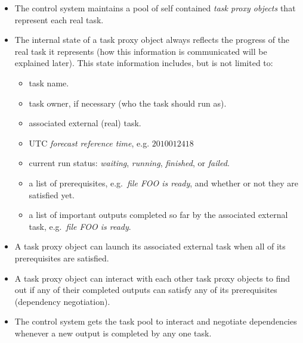 \documentclass[11pt,a4paper]{article}
\begin{document}
\begin{itemize}

    \item The control system maintains a pool of self contained {\em
        task proxy objects} that represent each real task. 
       
    \item The internal state of a task proxy object always reflects the
        progress of the real task it represents (how this information is
        communicated will be explained later). This state information
        includes, but is not limited to:

        \begin{itemize}

            \item task name.

            \item task owner, if necessary (who the task should run as).

            \item associated external (real) task.  

            \item UTC {\em forecast reference time}, e.g. $2010012418$
        
            \item current run status: {\em waiting}, {\em running}, 
                {\em finished}, or {\em failed}. 

            \item a list of prerequisites, e.g.\ {\em file FOO is
                ready}, and whether or not they are satisfied yet.

            \item a list of important outputs completed so far by the
                associated external task, e.g.\ {\em file FOO is ready}.

        \end{itemize}
       
    \item A task proxy object can launch its associated external task
        when all of its prerequisites are satisfied.

    \item A task proxy object can interact with each other task proxy
        objects to find out if any of their completed outputs can
        satisfy any of its prerequisites (dependency negotiation). 

    \item The control system gets the task pool to interact and
        negotiate dependencies whenever a new output is completed by any
        one task.
 
\end{itemize}
\end{document}
